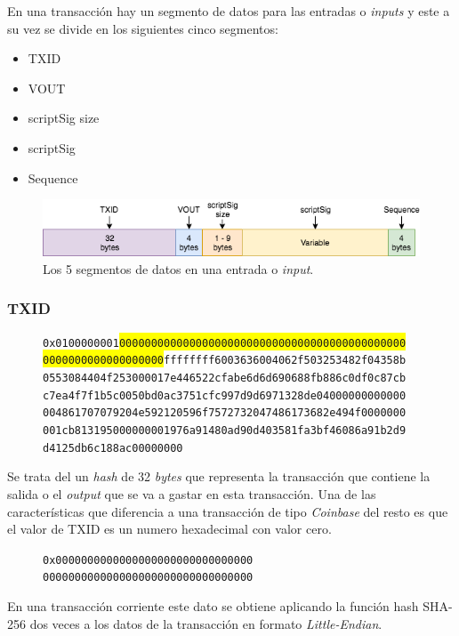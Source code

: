 \documentclass{article}
\begin{document}
    En una transacción hay un segmento de datos para las entradas o \textit{inputs} y este a su vez se divide en los siguientes cinco segmentos:
    
    \begin{itemize}
    \item TXID
    \item VOUT
    \item scriptSig size
    \item scriptSig
    \item Sequence
    \end{itemize}
    
    \begin{figure}[H]
    \centering
        \includegraphics[scale=0.57]{img/Bitcoin_transactions_data_input.png}
        \caption{Los 5 segmentos de datos en una entrada o \textit{input}.}
    \end{figure}
    
    \subsubsection{TXID}
    
    \begin{figure}[H]
        \texttt{0x0100000001\colorbox{Yellow}{000000000000000000000000000000000000000000000}} \\
        \texttt{\colorbox{Yellow}{0000000000000000000}ffffffff6003636004062f503253482f04358b} \\
        \texttt{0553084404f253000017e446522cfabe6d6d690688fb886c0df0c87cb} \\
        \texttt{c7ea4f7f1b5c0050bd0ac3751cfc997d9d6971328de04000000000000} \\
        \texttt{004861707079204e592120596f7572732047486173682e494f0000000} \\
        \texttt{001cb813195000000001976a91480ad90d403581fa3bf46086a91b2d9} \\
        \texttt{d4125db6c188ac00000000}
    \end{figure}
    
    Se trata del un \textit{hash} de 32 \textit{bytes} que representa la transacción que contiene la salida o el \textit{output} que se va a gastar en esta transacción. Una de las características que diferencia a una transacción de tipo \textit{Coinbase} del resto es que el valor de TXID es un numero hexadecimal con valor cero.
    \begin{figure}[H]
        \texttt{0x0000000000000000000000000000000} \\
        \texttt{000000000000000000000000000000000}
    \end{figure}
    En una transacción corriente este dato se obtiene aplicando la función hash SHA-256 dos veces a los datos de la transacción en formato \textit{Little-Endian}.
    
\end{document}
